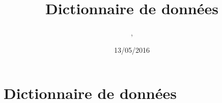 \documentclass[asi, sansVersion]{picInsa}
\begin{document}
\title{Dictionnaire de données}
\author{\Mathieu, \Julie}
\date{13/05/2016} 

\maketitle

\tableofcontents

\chapter{Dictionnaire de données}

\end{document}
